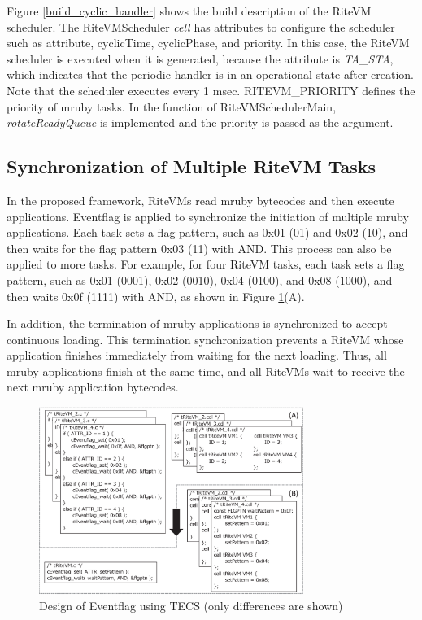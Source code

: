 \documentclass[conference]{IEEEtran/IEEEtran/IEEEtran}
\begin{document}
Figure \ref{build_cyclic_handler} shows the build description of the RiteVM scheduler.
The RiteVMScheduler {\it cell} has attributes to configure the scheduler such as attribute, cyclicTime, cyclicPhase, and priority.
In this case, the RiteVM scheduler is executed when it is generated, because the attribute is {\it TA\_STA}, which indicates that the periodic handler is in an operational state after creation.
Note that the scheduler executes every 1 msec.
RITEVM\_PRIORITY defines the priority of mruby tasks.
In the function of RiteVMSchedulerMain, {\it rotateReadyQueue} is implemented and the priority is passed as the argument.


\subsection{Synchronization of Multiple RiteVM Tasks}
\label{sec:Synchronization of Multiple RiteVM Tasks}
In the proposed framework, RiteVMs read mruby bytecodes and then execute applications.
Eventflag is applied to synchronize the initiation of multiple mruby applications.
Each task sets a flag pattern, such as 0x01 (01) and 0x02 (10), and then waits for the flag pattern 0x03 (11) with AND.
This process can also be applied to more tasks.
For example, for four RiteVM tasks, each task sets a flag pattern, such as 0x01 (0001), 0x02 (0010), 0x04 (0100), and 0x08 (1000), and then waits 0x0f (1111) with AND, as shown in Figure \ref{fig:Eventflag}(A).

In addition, the termination of mruby applications is synchronized to accept continuous loading.
This termination synchronization prevents a RiteVM whose application finishes immediately from waiting for the next loading.
Thus, all mruby applications finish at the same time, and all RiteVMs wait to receive the next mruby application bytecodes. 

\begin{figure}[t]
    \centering
    \includegraphics[width=8.6cm,clip]{figure/Eventflag.eps}
    \vspace{-3mm}
\caption{Design of Eventflag using TECS (only differences are shown)}
    \vspace{-3mm}
\label{fig:Eventflag}
\end{figure}
\end{document}
